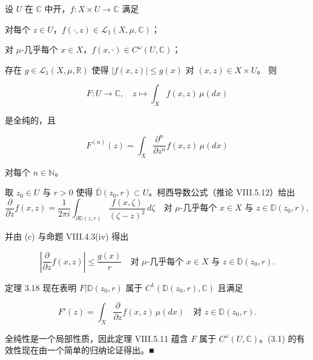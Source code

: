 \begin{corollary}

设 $ U $ 在 $ \mathbb{C} $ 中开，$ f: X \times U \to \mathbb{C} $ 满足

\begin{items}
\item

对每个 $ z \in U $，$ f(\cdot,z) \in \mathcal{L}_1(X,\mu,\mathbb{C}) $；

\item

对 $ \mu $-几乎每个 $ x \in X $，$ f(x,\cdot) \in C^{\omega}(U,\mathbb{C}) $；

\item

存在 $ g \in \mathcal{L}_1(X,\mu,\mathbb{R}) $ 使得 $ |f(x,z)| \le g(x) $ 对 $ (x,z) \in X \times U $。
则

\[
F: U \to \mathbb{C}, \quad z \mapsto \int_X f(x,z) \, \mu(dx)
\]

是全纯的，且

\begin{equation}
F^{(n)}(z) = \int_X \frac{\partial^n}{\partial z^n} f(x,z) \, \mu(dx)\tag{3.1}
\end{equation}

对每个 $ n \in \mathbb{N} $。

\proofhead
取 $ z_0 \in U $ 与 $ r > 0 $ 使得 $ \overline{\mathbb{D}}(z_0,r) \subset U $。柯西导数公式（推论 VIII.5.12）给出
\[
\frac{\partial}{\partial z} f(x,z) = \frac{1}{2\pi i} \int_{\partial\mathbb{D}(z,r)} \frac{f(x,\zeta)}{(\zeta - z)^2} \, d\zeta \quad \text{对 } \mu\text{-几乎每个 } x \in X \text{ 与 } z \in \mathbb{D}(z_0,r),
\]

并由 (c) 与命题 VIII.4.3(iv) 得出

\[
\left| \frac{\partial}{\partial z} f(x,z) \right| \le \frac{g(x)}{r} \quad \text{对 } \mu\text{-几乎每个 } x \in X \text{ 与 } z \in \mathbb{D}(z_0,r).
\]

定理 3.18 现在表明 $ F|\mathbb{D}(z_0,r) $ 属于 $ C^1(\mathbb{D}(z_0,r),\mathbb{C}) $ 且满足

\[
F'(z) = \int_X \frac{\partial}{\partial z} f(x,z) \, \mu(dx) \quad \text{对 } z \in \mathbb{D}(z_0,r).
\]

全纯性是一个局部性质，因此定理 VIII.5.11 蕴含 $ F $ 属于 $ C^{\omega}(U,\mathbb{C}) $。(3.1) 的有效性现在由一个简单的归纳论证得出。\nobreak\hspace{0.35em}■

\end{items}

\end{corollary}

